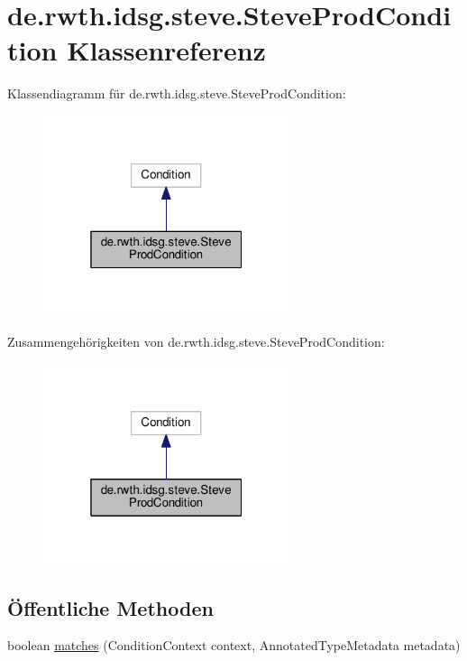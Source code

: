 \hypertarget{classde_1_1rwth_1_1idsg_1_1steve_1_1_steve_prod_condition}{\section{de.\+rwth.\+idsg.\+steve.\+Steve\+Prod\+Condition Klassenreferenz}
\label{classde_1_1rwth_1_1idsg_1_1steve_1_1_steve_prod_condition}
}


Klassendiagramm für de.\+rwth.\+idsg.\+steve.\+Steve\+Prod\+Condition\+:\nopagebreak
\begin{figure}[H]
\begin{center}
\leavevmode
\includegraphics[width=205pt]{classde_1_1rwth_1_1idsg_1_1steve_1_1_steve_prod_condition__inherit__graph}
\end{center}
\end{figure}


Zusammengehörigkeiten von de.\+rwth.\+idsg.\+steve.\+Steve\+Prod\+Condition\+:\nopagebreak
\begin{figure}[H]
\begin{center}
\leavevmode
\includegraphics[width=205pt]{classde_1_1rwth_1_1idsg_1_1steve_1_1_steve_prod_condition__coll__graph}
\end{center}
\end{figure}
\subsection*{Öffentliche Methoden}
\begin{DoxyCompactItemize}
\item 
boolean \hyperlink{classde_1_1rwth_1_1idsg_1_1steve_1_1_steve_prod_condition_aa8ec8306674d9b733233836175176c9b}{matches} (Condition\+Context context, Annotated\+Type\+Metadata metadata)
\end{DoxyCompactItemize}


